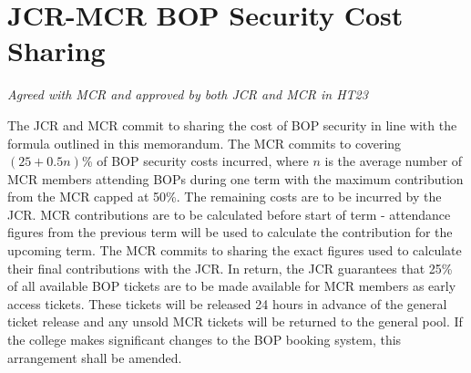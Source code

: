 \chapter{JCR-MCR BOP Security Cost Sharing}
\textit{Agreed with MCR and approved by both JCR and MCR in HT23}

\appnpara The JCR and MCR commit to sharing the cost of BOP security in line with the formula outlined in this memorandum. 
\appnpara The MCR commits to covering $(25+0.5n)$\% of BOP security costs incurred, where $n$ is the average number of MCR members attending BOPs during one term with the maximum contribution from the MCR capped at 50\%. The remaining costs are to be incurred by the JCR.
\appnpara MCR contributions are to be calculated before start of term - attendance figures from the previous term will be used to calculate the contribution for the upcoming term. The MCR commits to sharing the exact figures used to calculate their final contributions with the JCR.
\appnpara In return, the JCR guarantees that 25\% of all available BOP tickets are to be made available for MCR members as early access tickets. These tickets will be released 24 hours in advance of the general ticket release and any unsold MCR tickets will be returned to the general pool. 
\appnpara If the college makes significant changes to the BOP booking system, this arrangement shall be amended. 